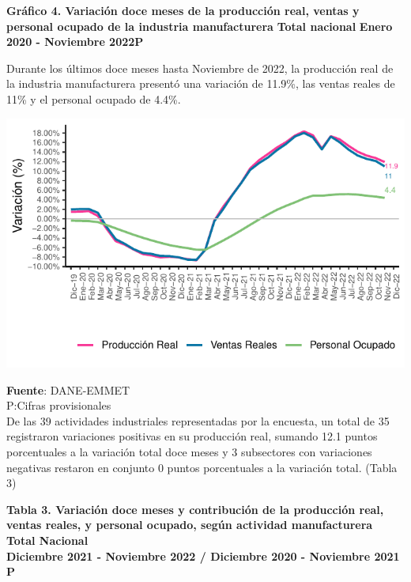 \documentclass[
]{article}
\begin{document}
\textbf{Gráfico 4. Variación doce meses de la producción real, ventas y
personal ocupado de la industria manufacturera} \textbf{Total nacional}
\textbf{Enero 2020 - Noviembre 2022P}

Durante los últimos doce meses hasta Noviembre de 2022, la producción
real de la industria manufacturera presentó una variación de 11.9\%, las
ventas reales de 11\% y el personal ocupado de 4.4\%.\\

\begin{center}\includegraphics{boletin_files/figure-latex/anio_corrido_view_2-1} \end{center}

\textbf{Fuente}: DANE-EMMET\\
P:Cifras provisionales\\

De las 39 actividades industriales representadas por la encuesta, un
total de 35 registraron variaciones positivas en su producción real,
sumando 12.1 puntos porcentuales a la variación total doce meses y 3
subsectores con variaciones negativas restaron en conjunto 0 puntos
porcentuales a la variación total. (Tabla 3)\\

\newpage

\textbf{Tabla 3. Variación doce meses y contribución de la producción real, ventas reales, y personal ocupado, según actividad manufacturera}\\
\textbf{Total Nacional}\\
\textbf{Diciembre 2021 - Noviembre 2022 / Diciembre 2020 - Noviembre 2021 P}
\end{document}
